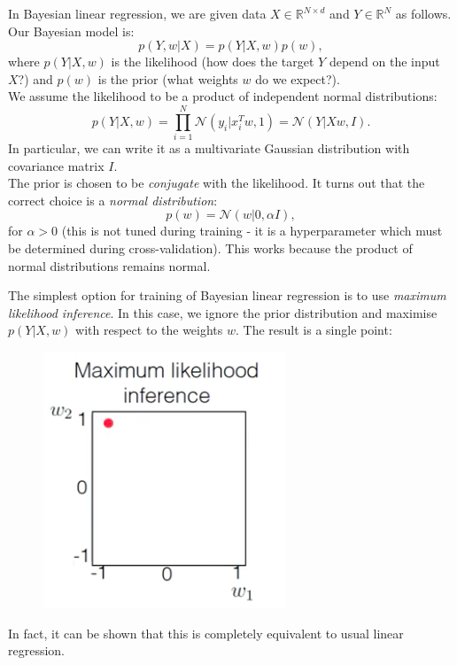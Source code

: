 In Bayesian linear regression, we are given data $X \in \mathbb{R}^{N \times d}$ and $Y \in \mathbb{R}^N$ as follows. Our Bayesian model is:
\begin{equation*}
p(Y, w| X) = p(Y | X,w) p(w),
\end{equation*}
where $p(Y | X,w)$ is the likelihood (how does the target $Y$ depend on the input $X$?) and $p(w)$ is the prior (what weights $w$ do we expect?).\\

We assume the likelihood to be a product of independent normal distributions:
\begin{equation*}
p(Y | X,w) = \prod_{i=1}^{N} \mathcal{N}(y_i | x_i^T w, 1) = \mathcal{N}(Y|Xw, I).
\end{equation*}
In particular, we can write it as a multivariate Gaussian distribution with covariance matrix $I$.\\

The prior is chosen to be \textit{conjugate} with the likelihood. It turns out that the correct choice is a \textit{normal distribution}:
\begin{equation*}
p(w) = \mathcal{N}(w | 0, \alpha I),
\end{equation*}
for $\alpha > 0$ (this is not tuned during training - it is a hyperparameter which must be determined during cross-validation). This works because the product of normal distributions remains normal.

\minirule

The simplest option for training of Bayesian linear regression is to use \textit{maximum likelihood inference}. In this case, we ignore the prior distribution and maximise $p(Y | X,w)$ with respect to the weights $w$. The result is a single point:
\begin{figure}[H]
\centering
\includegraphics[scale=0.4]{mlepointestimate.png}
\end{figure}
In fact, it can be shown that this is completely equivalent to usual linear regression.


